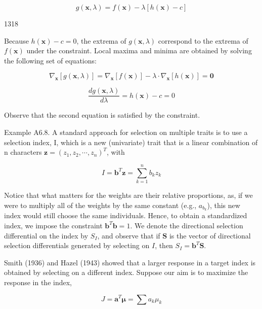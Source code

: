 \documentclass{article}
\begin{document}
\begin{equation}
g(\mathbf{x},\lambda)=f(\mathbf{x})-\lambda[h(\mathbf{x})-c]
\end{equation}

1318

Because  $ h(\mathbf{x}) - c = 0 $, the extrema of  $ g(\mathbf{x}, \lambda) $ correspond to the extrema of  $ f(\mathbf{x}) $ under the constraint. Local maxima and minima are obtained by solving the following set of equations:

\begin{equation}
\nabla_{\mathbf{x}}[g(\mathbf{x},\lambda)]=\nabla_{\mathbf{x}}[f(\mathbf{x})]-\lambda\cdot\nabla_{\mathbf{x}}[h(\mathbf{x})]=\mathbf{0}
\end{equation}

\begin{equation}
\frac{d g(\mathbf{x},\lambda)}{d\lambda}=h(\mathbf{x})-c=0
\end{equation}

Observe that the second equation is satisfied by the constraint.

Example A6.8. A standard approach for selection on multiple traits is to use a selection index, I, which is a new (univariate) trait that is a linear combination of n characters  $ \mathbf{z} = (z_1, z_2, \cdots, z_n)^T $, with

\begin{equation}
I=\mathbf{b}^{T}\mathbf{z}=\sum_{k=1}^{n}b_{k}z_{k}
\end{equation}

Notice that what matters for the weights are their relative proportions, as, if we were to multiply all of the weights by the same constant (e.g.,  $ a_{b_k} $), this new index would still choose the same individuals. Hence, to obtain a standardized index, we impose the constraint  $ \mathbf{b}^T\mathbf{b} = 1 $. We denote the directional selection differential on the index by  $ S_I $, and observe that if  $ \mathbf{S} $ is the vector of directional selection differentials generated by selecting on  $ I $, then  $ S_I = \mathbf{b}^T\mathbf{S} $.

Smith (1936) and Hazel (1943) showed that a larger response in a target index is obtained by selecting on a different index. Suppose our aim is to maximize the response in the index,

\begin{equation}
J=\mathbf{a}^{T}\boldsymbol{\mu}=\sum a_{k}\mu_{k}
\end{equation}
\end{document}
